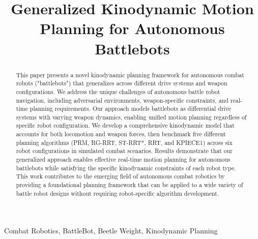 \documentclass[conference]{IEEEtran}
\begin{document}
\title{Generalized Kinodynamic Motion Planning for Autonomous Battlebots}

\author{
}

\maketitle

\begin{abstract}
This paper presents a novel kinodynamic planning framework for autonomous combat robots ("battlebots") that generalizes across different drive systems and weapon configurations. We address the unique challenges of autonomous battle robot navigation, including adversarial environments, weapon-specific constraints, and real-time planning requirements. Our approach models battlebots as differential drive systems with varying weapon dynamics, enabling unified motion planning regardless of specific robot configuration. We develop a comprehensive kinodynamic model that accounts for both locomotion and weapon forces, then benchmark five different planning algorithms (PRM, RG-RRT, ST-RRT*, RRT, and KPIECE1) across six robot configurations in simulated combat scenarios. Results demonstrate that our generalized approach enables effective real-time motion planning for autonomous battlebots while satisfying the specific kinodynamic constraints of each robot type. This work contributes to the emerging field of autonomous combat robotics by providing a foundational planning framework that can be applied to a wide variety of battle robot designs without requiring robot-specific algorithm development.
\end{abstract}

\begin{IEEEkeywords}
Combat Robotics, BattleBot, Beetle Weight, Kinodynamic Planning
\end{IEEEkeywords}
\end{document}
